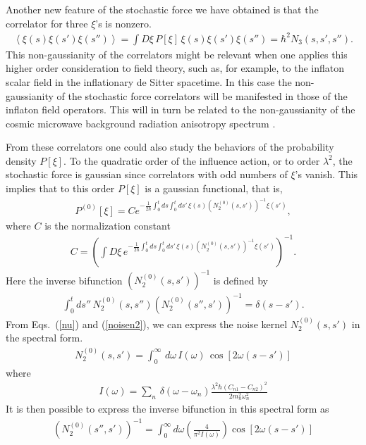 \documentclass[%
amssymb,preprint,preprintnumbers,nofootinbib,superscriptaddress]{revtex4}
\begin{document}
Another new feature of the stochastic force we have obtained is that the correlator for three $\xi$'s is nonzero.
\begin{eqnarray}
\left\langle\xi(s)\xi(s')\xi(s'')\right\rangle=\int D\xi\, P[\xi]\,\xi(s)\xi(s')\xi(s'')
=\hbar^{2}  N_{3}(s,s',s'').
\end{eqnarray}
This non-gaussianity of the correlators might be relevant when one applies this higher order consideration to field theory, such as, for example, to the inflaton scalar field in the inflationary de Sitter spacetime. In this case the non-gaussianity of the stochastic force correlators will be manifested in those of the inflaton field operators. This will in turn be related to the non-gaussianity of the cosmic microwave background radiation anisotropy spectrum \cite{ChoNg20,ChoNg26}.

From these correlators one could also study the behaviors of the probability density $P[\xi]$. To the quadratic order of the influence action, or to order $\lambda^{2}$, the stochastic force is gaussian since correlators with odd numbers of $\xi$'s vanish. This implies that to this order $P[\xi]$ is a gaussian functional, that is,
\begin{eqnarray}
P^{(0)}[\xi]=Ce^{-\frac{1}{2\hbar}\int_{0}^{t}ds\int_{0}^{t}ds'\,\xi(s)\left(N_{2}^{(0)}(s,s')\right)^{-1}\xi(s')},
\end{eqnarray}
where $C$ is the normalization constant
\begin{eqnarray}
C=\left(\int D\xi\, e^{-\frac{1}{2\hbar}\int_{0}^{t}ds\int_{0}^{t}ds'\,\xi(s)\left(N_{2}^{(0)}(s,s')\right)^{-1}\xi(s')}\right)^{-1}.
\end{eqnarray}
Here the inverse bifunction $\left(N_{2}^{(0)}(s,s')\right)^{-1}$ is defined by
\begin{eqnarray}
\int_{0}^{t}ds''\, N_{2}^{(0)}(s,s'')\left(N_{2}^{(0)}(s'',s')\right)^{-1}=\delta(s-s').
\end{eqnarray}
From Eqs.~(\ref{nu}) and (\ref{noisen2}), we can express  the noise kernel $N_{2}^{(0)}(s,s')$ in the spectral form.
\begin{eqnarray}
    N_{2}^{(0)}(s,s')=\int_{0}^{\infty}\,d\omega\,I(\omega)\,\cos[2\omega(s-s')]
\end{eqnarray}
where
\begin{eqnarray}
    I(\omega)=\sum_{n}\,\delta(\omega-\omega_{n})\frac{\lambda^{2}\hbar(C_{n1}-C_{n2})^{2}}{2m_{n}^{2}\omega_{n}^{2}}
\end{eqnarray}
It is then possible to express the inverse bifunction in this spectral form as
\begin{eqnarray}
    \left(N_{2}^{(0)}(s'',s')\right)^{-1}=\int_{0}^{\infty}d\omega\left(\frac{4}{\pi^{2}I(\omega)}\right)\cos[2\omega(s-s')]
\end{eqnarray}
\end{document}
